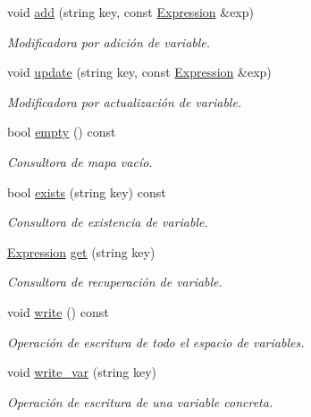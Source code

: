 \begin{DoxyCompactItemize}
\item 
void \hyperlink{class_variable_space_aeea8108f8b575dd59949fde1e3a1e3b0}{add} (string key, const \hyperlink{class_expression}{Expression} \&exp)
\begin{DoxyCompactList}\small\item\em Modificadora por adición de variable. \end{DoxyCompactList}\item 
void \hyperlink{class_variable_space_aeddaf9cb3232bf4ee1e1273bcef5e6b8}{update} (string key, const \hyperlink{class_expression}{Expression} \&exp)
\begin{DoxyCompactList}\small\item\em Modificadora por actualización de variable. \end{DoxyCompactList}\item 
bool \hyperlink{class_variable_space_afe850fa6a1dd65e8dffda97d70b7bd93}{empty} () const 
\begin{DoxyCompactList}\small\item\em Consultora de mapa vacío. \end{DoxyCompactList}\item 
bool \hyperlink{class_variable_space_abb2147dc634abb8256c9c35b7a170b03}{exists} (string key) const 
\begin{DoxyCompactList}\small\item\em Consultora de existencia de variable. \end{DoxyCompactList}\item 
\hyperlink{class_expression}{Expression} \hyperlink{class_variable_space_ab2ac32b14e9968c0e7a6aa6f70dfde4e}{get} (string key)
\begin{DoxyCompactList}\small\item\em Consultora de recuperación de variable. \end{DoxyCompactList}\item 
void \hyperlink{class_variable_space_a98f9eac695830e33d68341515bfd0b4f}{write} () const 
\begin{DoxyCompactList}\small\item\em Operación de escritura de todo el espacio de variables. \end{DoxyCompactList}\item 
void \hyperlink{class_variable_space_a15b32633f6bf18d04323ea9f55f40b24}{write\+\_\+var} (string key)
\begin{DoxyCompactList}\small\item\em Operación de escritura de una variable concreta. \end{DoxyCompactList}\end{DoxyCompactItemize}


